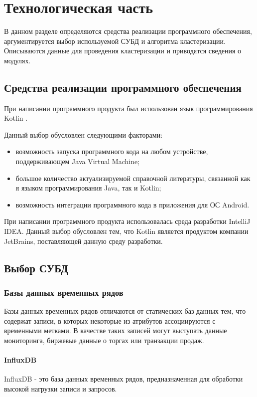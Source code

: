 \section{Технологическая часть}
В данном разделе определяются средства реализации программного обеспечения, аргументируется выбор используемой СУБД и алгоритма кластеризации. Описываются данные для проведения кластеризации и приводятся сведения о модулях.

\subsection{Средства реализации программного обеспечения}
При написании программного продукта был использован язык программирования Kotlin \cite{Kotlin}.

Данный выбор обусловлен следующими факторами:
\begin{itemize}[leftmargin=1.6\parindent]
\item возможность запуска программного кода на любом устройстве, поддерживающем Java Virtual Machine;
\item большое количество актуализируемой справочной литературы, связанной как я языком программирования Java, так и Kotlin;
\item возможность интеграции программного кода в приложения для ОС Android.
\end{itemize}

При написании программного продукта использовалась среда разработки IntelliJ IDEA. Данный выбор обусловлен тем, что Kotlin является продуктом компании JetBrains, поставляющей данную среду разработки.

\subsection{Выбор СУБД}

\subsubsection{Базы данных временных рядов}
Базы данных временных рядов отличаются от статических баз данных тем, что содержат записи, в которых некоторые из атрибутов ассоциируются с временными метками. В качестве таких записей могут выступать данные мониторинга, биржевые данные о торгах или транзакции продаж. \cite{bdvrAnomalies}

\paragraph{InfluxDB}
InfluxDB - это база данных временных рядов, предназначенная для обработки высокой нагрузки записи и запросов.

